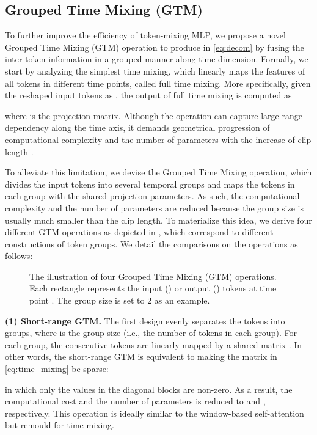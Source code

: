 \documentclass[10pt,twocolumn,letterpaper]{article}
\begin{document}
\subsection{Grouped Time Mixing (GTM)}
To further improve the efficiency of token-mixing MLP, we propose a novel Grouped Time Mixing (GTM) operation to produce  in \cref{eq:decom} by fusing the inter-token information in a grouped manner along time dimension.
Formally, we start by analyzing the simplest time mixing, which linearly maps the features of all tokens in different time points, called full time mixing. More specifically, given the reshaped input tokens as , the output of full time mixing is computed as

where  is the projection matrix. Although the operation can capture large-range dependency along the time axis, it demands geometrical progression of computational complexity  and the number of parameters  with the increase of clip length .

To alleviate this limitation, we devise the Grouped Time Mixing operation, which divides the input tokens into several temporal groups and maps the tokens in each group with the shared projection parameters. As such, the computational complexity and the number of parameters are reduced because the group size is usually much smaller than the clip length. To materialize this idea, we derive four different GTM operations as depicted in , which correspond to different constructions of token groups. We detail the comparisons on the operations as follows:

\begin{figure}[!tb]
   \vspace{-0.1in}
   \caption{\small The illustration of four Grouped Time Mixing (GTM) operations. Each rectangle represents the input () or output () tokens at time point . The group size is set to 2 as an example.}
   \label{fig:gtm}
   \vspace{-0.2in}
\end{figure}

\textbf{(1) Short-range GTM.} The first design evenly separates the tokens into  groups, where  is the group size (i.e., the number of tokens in each group). For each group, the consecutive  tokens are linearly mapped by a shared matrix . In other words, the short-range GTM is equivalent to making the matrix  in \cref{eq:time_mixing} be sparse:

in which only the values in the diagonal blocks are non-zero. As a result, the computational cost and the number of parameters is reduced to  and , respectively. This operation is ideally similar to the window-based self-attention \cite{huang2021shuffle,liu2021swin} but remould for time mixing.
\end{document}
